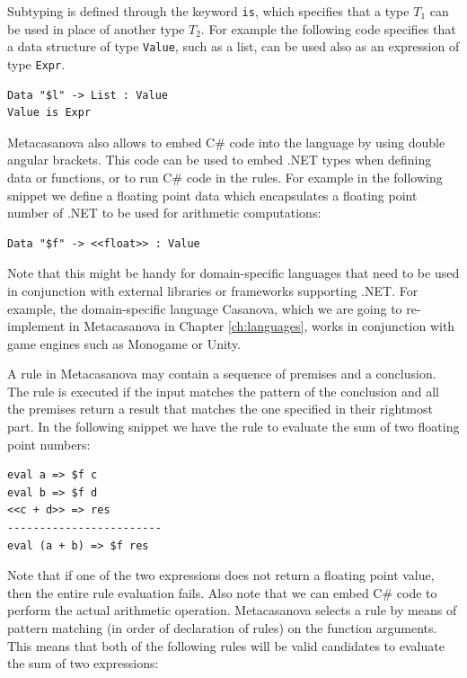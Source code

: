 \noindent
Subtyping is defined through the keyword \texttt{is}, which specifies that a type $T_1$ can be used in place of another type $T_2$. For example the following code specifies that a data structure of type \texttt{Value}, such as a list, can be used also as an expression of type \texttt{Expr}.

\begin{lstlisting}
Data "$l" -> List : Value 
Value is Expr
\end{lstlisting}

Metacasanova also allows to embed C\# code into the language by using double angular brackets. This code can be used to embed .NET types when defining data or functions, or to run C\# code in the rules. For example in the following snippet we define a floating point data which encapsulates a floating point number of .NET to be used for arithmetic computations:

\begin{lstlisting}
Data "$f" -> <<float>> : Value
\end{lstlisting}

\noindent
Note that this might be handy for domain-specific languages that need to be used in conjunction with external libraries or frameworks supporting .NET. For example, the domain-specific language Casanova, which we are going to re-implement in Metacasanova in Chapter \ref{ch:languages}, works in conjunction with game engines such as Monogame or Unity.

A rule in Metacasanova may contain a sequence of premises and a conclusion. The rule is executed if the input matches the pattern of the conclusion and all the premises return a result that matches the one specified in their rightmost part. In the following snippet we have the rule to evaluate the sum of two floating point numbers:

\begin{lstlisting}
eval a => $f c
eval b => $f d
<<c + d>> => res
------------------------
eval (a + b) => $f res
\end{lstlisting}

\noindent
Note that if one of the two expressions does not return a floating point value, then the entire rule evaluation fails. Also note that we can embed C\# code to perform the actual arithmetic operation. Metacasanova selects a rule by means of pattern matching (in order of declaration of rules) on the function arguments. This means that both of the following rules will be valid candidates to evaluate the sum of two expressions:

